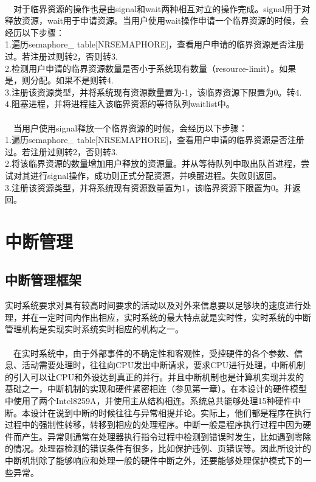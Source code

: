 \documentclass[UTF8,nofonts,cs4size]{ctexrep}
\begin{document}
\paragraph{}
\indent \ \ 对于临界资源的操作也是由signal和wait两种相互对立的操作完成。signal用于对释放资源，wait用于申请资源。当用户使用wait操作申请一个临界资源的时候，会经历以下步骤：
\\ \indent 1.遍历semaphore\_ table[NRSEMAPHORE]，查看用户申请的临界资源是否注册过。若注册过则转2，否则转3.
\\ \indent 2.检测用户申请的临界资源数量是否小于系统现有数量（resource-limit）。如果是，则分配。如果不是则转4.
\\ \indent 3.注册该资源类型，并将系统现有资源数量置为-1，该临界资源下限置为0。转4.
\\ \indent 4.阻塞进程，并将进程挂入该临界资源的等待队列waitlist中。
\paragraph{}
\indent \ \ 当用户使用signal释放一个临界资源的时候，会经历以下步骤：
\\ \indent 1.遍历semaphore\_ table[NRSEMAPHORE]，查看用户申请的临界资源是否注册过。若注册过则转2，否则转3.
\\ \indent 2.将该临界资源的数量增加用户释放的资源量。并从等待队列中取出队首进程，尝试对其进行signal操作，成功则正式分配资源，并唤醒进程。失败则返回。
\\ \indent 3.注册该资源类型，并将系统现有资源数量置为1，该临界资源下限置为0。并返回。


\section{中断管理}
\subsection{中断管理框架}
实时系统要求对具有较高时间要求的活动以及对外来信息要以足够块的速度进行处理，并在一定时间内作出相应，实时系统的最大特点就是实时性，实时系统的中断管理机构是实现实时系统实时相应的机构之一。
\paragraph{}
\indent \ \ 在实时系统中，由于外部事件的不确定性和客观性，受控硬件的各个参数、信息、活动需要处理时，往往向CPU发出中断请求，要求CPU进行处理，中断机制的引入可以让CPU和外设达到真正的并行。并且中断机制也是计算机实现并发的基础之一，中断机制的实现和硬件紧密相连（参见第一章）。在本设计的硬件模型中使用了两个Intel8259A，并使用主从结构相连。系统总共能够处理15种硬件中断。本设计在说到中断的时候往往与异常相提并论。实际上，他们都是程序在执行过程中的强制性转移，转移到相应的处理程序。中断一般是程序执行过程中因为硬件而产生。异常则通常在处理器执行指令过程中检测到错误时发生，比如遇到零除的情况。处理器检测的错误条件有很多，比如保护违例、页错误等。因此所设计的中断机制除了能够响应和处理一般的硬件中断之外，还要能够处理保护模式下的一些异常。
\end{document}

